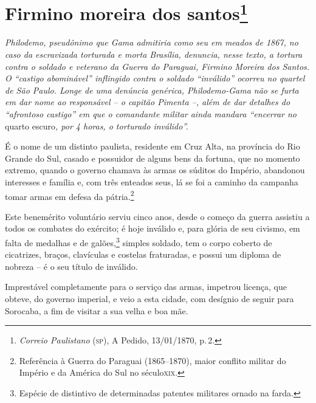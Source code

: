 \chapter{Firmino moreira dos santos\footnote{\emph{Correio Paulistano} (\textsc{sp}), A Pedido, 13/01/1870,
  p.\,2.}} %

\begin{didascalia}
\emph{Philodemo, pseudônimo que Gama admitiria como seu em meados de
1867, no caso da escravizada torturada e morta Brasília, denuncia, nesse
texto, a tortura contra o soldado e veterano da Guerra do Paraguai,
Firmino Moreira dos Santos. O ``castigo abominável'' inflingido contra o
soldado ``inválido'' ocorreu no quartel de São Paulo. Longe de uma
denúncia genérica, Philodemo-Gama não se furta em dar nome ao
responsável -- o capitão Pimenta --, além de dar detalhes do ``afrontoso
castigo'' em que o comandante militar ainda mandara ``encerrar no} quarto
escuro\emph{, por 4 horas, o torturado inválido''.}
\end{didascalia}


É o nome de um distinto paulista, residente em Cruz Alta, na província
do Rio Grande do Sul, casado e possuidor de alguns bens da fortuna, que
no momento extremo, quando o governo chamava às armas os súditos do
Império, abandonou interesses e família e, com três enteados seus, lá se
foi a caminho da campanha tomar armas em defesa da pátria.\footnote{
  Referência à Guerra do Paraguai (1865--1870), maior conflito militar do
  Império e da América do Sul no século\textsc{xix}.}

Este benemérito voluntário serviu cinco anos, desde o começo da guerra
assistiu a todos os combates do exército; é hoje inválido e, para glória
de seu civismo, em falta de medalhas e de galões,\footnote{ Espécie
  de distintivo de determinadas patentes militares ornado na farda.}
simples soldado, tem o corpo coberto de cicatrizes, braços, clavículas e
costelas fraturadas, e possui um diploma de nobreza -- é o seu título de
inválido.

Imprestável completamente para o serviço das armas, impetrou licença,
que obteve, do governo imperial, e veio a esta cidade, com desígnio de
seguir para Sorocaba, a fim de visitar a sua velha e boa mãe.

